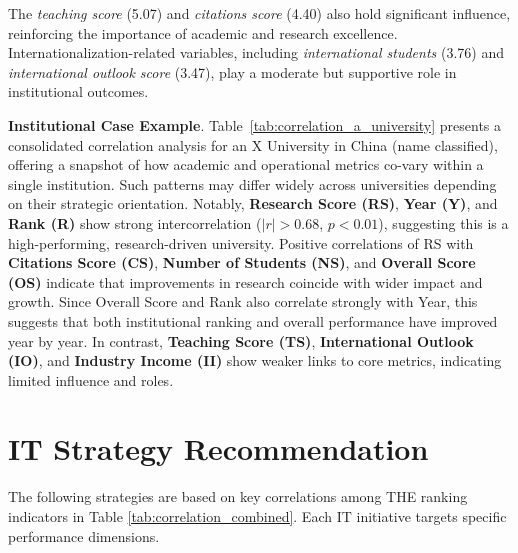 \documentclass[conference]{IEEEtran}
\begin{document}
The \textit{teaching score} (5.07) and \textit{citations score} (4.40) also hold significant influence, reinforcing the importance of academic and research excellence. Internationalization-related variables, including \textit{international students} (3.76) and \textit{international outlook score} (3.47), play a moderate but supportive role in institutional outcomes.

\textbf{Institutional Case Example}. Table~\ref{tab:correlation_a_university} presents a consolidated correlation analysis for an \textsf{X} University in China (name classified), offering a snapshot of how academic and operational metrics co-vary within a single institution. Such patterns may differ widely across universities depending on their strategic orientation. Notably, \textbf{Research Score (RS)}, \textbf{Year (Y)}, and \textbf{Rank (R)} show strong intercorrelation ($|r| > 0.68$, $p < 0.01$), suggesting this is a high-performing, research-driven university. Positive correlations of RS with \textbf{Citations Score (CS)}, \textbf{Number of Students (NS)}, and \textbf{Overall Score (OS)} indicate that improvements in research coincide with wider impact and growth. Since Overall Score and Rank also correlate strongly with Year, this suggests that both institutional ranking and overall performance have improved year by year. In contrast, \textbf{Teaching Score (TS)}, \textbf{International Outlook (IO)}, and \textbf{Industry Income (II)} show weaker links to core metrics, indicating limited influence and roles.






\section{IT Strategy Recommendation}

The following strategies are based on key correlations among THE ranking indicators in Table \ref{tab:correlation_combined}. Each IT initiative targets specific performance dimensions.
\end{document}

